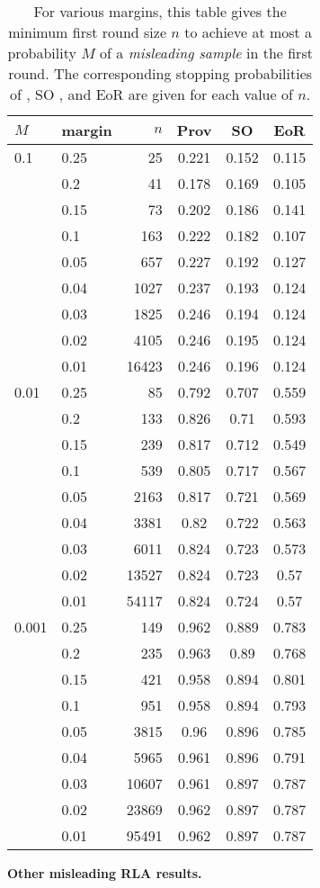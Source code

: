 \begin{table}
\center
\begin{tabular}{ |l|l|r|c|c|c| }
\hline
$M$ & margin & $n$ & Prov & SO & EoR \\
\hline
0.1&0.25&25&0.221&0.152&0.115\\
&0.2&41&0.178&0.169&0.105\\
&0.15&73&0.202&0.186&0.141\\
&0.1&163&0.222&0.182&0.107\\
&0.05&657&0.227&0.192&0.127\\
&0.04&1027&0.237&0.193&0.124\\
&0.03&1825&0.246&0.194&0.124\\
&0.02&4105&0.246&0.195&0.124\\
&0.01&16423&0.246&0.196&0.124\\
\hline
0.01&0.25&85&0.792&0.707&0.559\\
&0.2&133&0.826&0.71&0.593\\
&0.15&239&0.817&0.712&0.549\\
&0.1&539&0.805&0.717&0.567\\
&0.05&2163&0.817&0.721&0.569\\
&0.04&3381&0.82&0.722&0.563\\
&0.03&6011&0.824&0.723&0.573\\
&0.02&13527&0.824&0.723&0.57\\
&0.01&54117&0.824&0.724&0.57\\
\hline
0.001&0.25&149&0.962&0.889&0.783\\
&0.2&235&0.963&0.89&0.768\\
&0.15&421&0.958&0.894&0.801\\
&0.1&951&0.958&0.894&0.793\\
&0.05&3815&0.96&0.896&0.785\\
&0.04&5965&0.961&0.896&0.791\\
&0.03&10607&0.961&0.897&0.787\\
&0.02&23869&0.962&0.897&0.787\\
&0.01&95491&0.962&0.897&0.787\\
\hline
\end{tabular}
\caption{For various margins, this table gives the minimum first round size $n$ to achieve at most a probability $M$ of a \emph{misleading sample} in the first round. The corresponding stopping probabilities of \Providence, SO \BRAVO, and EoR \BRAVO are given for each value of $n$.}
\label{tab:misleading}
\end{table}


\textbf{Other misleading RLA results.}





